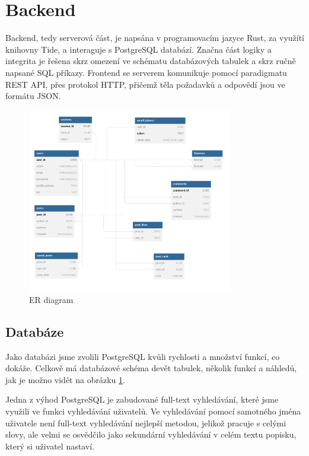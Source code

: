 \section{Backend}

Backend, tedy serverová část, je napsána v programovacím jazyce Rust, za využítí knihovny Tide, a
interaguje s PostgreSQL databází. Značna část logiky a integrita je řešena skrz omezení ve schématu
databázových tabulek a skrz ručně napsané SQL příkazy. Frontend se serverem komunikuje pomocí
paradigmatu REST API, přes protokol HTTP, přičemž těla požadavků a odpovědí jsou ve formátu JSON.

\begin{figure}[h!] 
    \centering
    \includegraphics[width=0.8\textwidth]{images/er-diagram.png}
    \caption{ER diagram}
    \label{er-diagram}
\end{figure}

\subsection{Databáze}

Jako databázi jsme zvolili PostgreSQL kvůli rychlosti a množství funkcí, co dokáže. Celkově má
databázové schéma devět tabulek, několik funkcí a náhledů, jak je možno vidět na obrázku
\ref{er-diagram}.

Jedna z výhod PostgreSQL je zabudované full-text vyhledávání, které jsme využili ve funkci
vyhledávání uživatelů. Ve vyhledávání pomocí samotného jména uživatele není full-text vyhledávání
nejlepší metodou, jelikož pracuje s celými slovy, ale velmi se osvědčilo jako sekundární vyhledávání
v celém textu popisku, který si uživatel nastaví.


